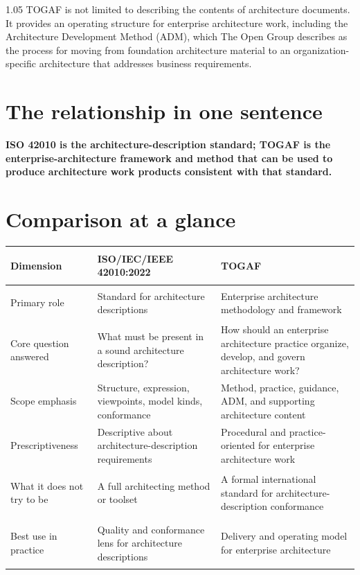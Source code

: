 \documentclass[11pt]{article}
\begin{document}
\begin{spacing}{1.05}
TOGAF is not limited to describing the contents of architecture documents. It provides an operating structure for enterprise architecture work, including the Architecture Development Method (ADM), which The Open Group describes as the process for moving from foundation architecture material to an organization-specific architecture that addresses business requirements.\cite{togafadm}

\section{The relationship in one sentence}

\textbf{ISO 42010 is the architecture-description standard; TOGAF is the enterprise-architecture framework and method that can be used to produce architecture work products consistent with that standard.}\cite{iso42010,togaf,togafadm}

\section{Comparison at a glance}

\renewcommand{\arraystretch}{1.2}
\begin{tabularx}{\textwidth}{@{}>{\bfseries\raggedright\arraybackslash}p{}>{\raggedright\arraybackslash}X>{\raggedright\arraybackslash}X@{}}
\toprule
Dimension & ISO/IEC/IEEE 42010:2022 & TOGAF \\
\midrule
Primary role & Standard for architecture descriptions & Enterprise architecture methodology and framework \\
Core question answered & What must be present in a sound architecture description? & How should an enterprise architecture practice organize, develop, and govern architecture work? \\
Scope emphasis & Structure, expression, viewpoints, model kinds, conformance & Method, practice, guidance, ADM, and supporting architecture content \\
Prescriptiveness & Descriptive about architecture-description requirements & Procedural and practice-oriented for enterprise architecture work \\
What it does not try to be & A full architecting method or toolset & A formal international standard for architecture-description conformance \\
Best use in practice & Quality and conformance lens for architecture descriptions & Delivery and operating model for enterprise architecture \\
\bottomrule
\end{tabularx}


\end{spacing}
\end{document}
